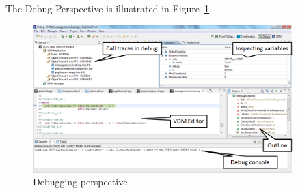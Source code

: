 \documentclass{overturerepchap}
\begin{document}
The Debug Perspective is illustrated in Figure~\ref{fig:userguide:DebuggingVDM}

\begin{figure}[htp]
\begin{center}
  \includegraphics[width=380px]{figures/DebuggingVDM}
  \caption[Debugging perspective]{Debugging perspective}
  \label{fig:userguide:DebuggingVDM}
\end{center}
\end{figure}

\end{document}
